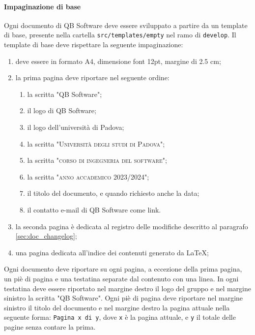         \paragraph{Impaginazione di base}
            Ogni documento di QB Software deve essere sviluppato a partire da un template di base, presente nella cartella \verb|src/templates/empty| nel ramo di \verb|develop|. Il template di base deve rispettare la seguente impaginazione:
            \begin{enumerate}[label=\Roman*)]
                \item deve essere in formato A4, dimensione font 12pt, margine di 2.5 cm;
                \item la prima pagina deve riportare nel seguente ordine:
                \begin{enumerate}[label=\arabic*.]
                    \item la scritta "QB Software";
                    \item il logo di QB Software;
                    \item il logo dell'università di Padova;
                    \item la scritta "\textsc{Università degli studi di Padova}";
                    \item la scritta "\textsc{corso di ingegneria del software}";
                    \item la scritta "\textsc{anno accademico 2023/2024}";
                    \item il titolo del documento, e quando richiesto anche la data;
                    \item il contatto e-mail di QB Software come link.
                \end{enumerate}
                \item la seconda pagina è dedicata al registro delle modifiche descritto al paragrafo \ref{sec:doc_changelog};
                \item una pagina dedicata all'indice dei contenuti generato da \LaTeX;
            \end{enumerate}
            Ogni documento deve riportare su ogni pagina, a eccezione della prima pagina, un piè di pagina e una testatina separate dal contenuto con una linea. In ogni testatina deve essere riportato nel margine destro il logo del gruppo e nel margine sinistro la scritta "QB Software". Ogni piè di pagina deve riportare nel margine sinistro il titolo del documento e nel margine destro la pagina attuale nella seguente forma: \verb|Pagina x di y|, dove \verb|x| è la pagina attuale, e \verb|y| il totale delle pagine senza contare la prima.
        
